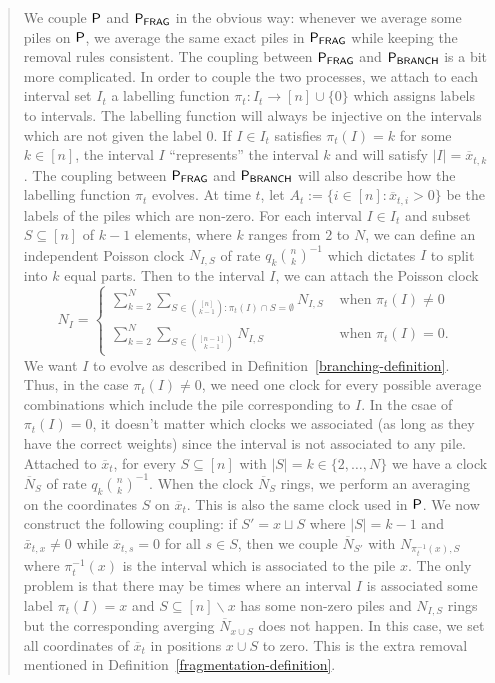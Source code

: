 \documentclass[12pt]{article}
\begin{document}
\begin{quote}
	We couple $\mathsf{P}$ and $\mathsf{P}_{\mathsf{FRAG}}$ in the obvious way: whenever we average some piles on $\mathsf{P}$, we average the same exact piles in $\mathsf{P}_{\mathsf{FRAG}}$ while keeping the removal rules consistent. The coupling between $\mathsf{P}_{\mathsf{FRAG}}$ and $\mathsf{P}_{\mathsf{BRANCH}}$ is a bit more complicated. In order to couple the two processes, we attach to each interval set $I_t$ a labelling function $\pi_t : I_t \to [n] \cup \{0\}$ which assigns labels to intervals. The labelling function will always be injective on the intervals which are not given the label $0$. If $I \in I_t$ satisfies $\pi_t(I) = k$ for some $k \in [n]$, the interval $I$ ``represents'' the interval $k$ and will satisfy $|I| = \overline{x}_{t, k}$. The coupling between $\mathsf{P}_{\mathsf{FRAG}}$ and $\mathsf{P}_{\mathsf{BRANCH}}$ will also describe how the labelling function $\pi_t$ evolves. At time $t$, let $A_t := \{i \in [n] : \overline{x}_{t, i} > 0\}$ be the labels of the piles which are non-zero. For each interval $I \in I_t$ and subset $S \subseteq [n]$ of $k-1$ elements, where $k$ ranges from $2$ to $N$, we can define an independent Poisson clock $N_{I, S}$ of rate $q_k \binom{n}{k}^{-1}$ which dictates $I$ to split into $k$ equal parts. Then to the interval $I$, we can attach the Poisson clock
	\[
		N_I = \begin{cases}
			\sum_{k = 2}^N \sum_{S \in \binom{[n]}{k-1} : \pi_t(I) \cap S = \emptyset} N_{I, S} & \text{ when $\pi_t(I) \neq 0$} \\
			\sum_{k = 2}^N \sum_{S \in \binom{[n-1]}{k-1}} N_{I, S} & \text{ when $\pi_t(I) = 0$}.
		\end{cases}
	\]
	We want $I$ to evolve as described in Definition~\ref{branching-definition}. Thus, in the case $\pi_t(I) \neq 0$, we need one clock for every possible average combinations which include the pile corresponding to $I$. In the csae of $\pi_t(I) = 0$, it doesn't matter which clocks we associated (as long as they have the correct weights) since the interval is not associated to any pile. Attached to $\overline{x}_t$, for every $S \subseteq [n]$ with $|S| = k \in \{2, \ldots, N\}$ we have a clock $\overline{N}_S$ of rate $q_k \binom{n}{k}^{-1}$. When the clock $\overline{N}_S$ rings, we perform an averaging on the coordinates $S$ on $\overline{x}_t$. This is also the same clock used in $\mathsf{P}$. We now construct the following coupling: if $S' = x \sqcup S$ where $|S| = k-1$ and $\bar{x}_{t, x} \neq 0$ while $\overline{x}_{t,s} = 0$ for all $s \in S$, then we couple $\overline{N}_{S'}$ with $N_{\pi_t^{-1}(x), S}$ where $\pi_t^{-1}(x)$ is the interval which is associated to the pile $x$. The only problem is that there may be times where an interval $I$ is associated some label $\pi_t(I) = x$ and $S \subseteq [n] \backslash x$ has some non-zero piles and $N_{I, S}$ rings but the corresponding averging $\overline{N}_{x \cup S}$ does not happen. In this case, we set all coordinates of $\overline{x}_t$ in positions $x \cup S$ to zero. This is the extra removal mentioned in Definition~\ref{fragmentation-definition}. \\


\end{quote}
\end{document}
